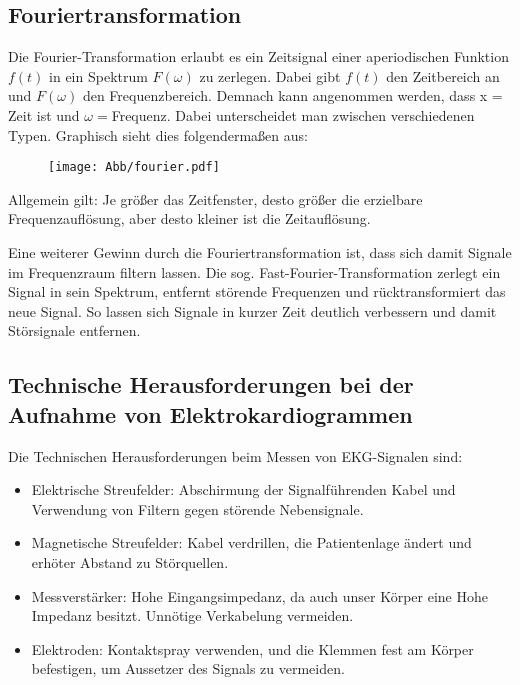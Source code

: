 \subsection{Fouriertransformation }
Die Fourier-Transformation erlaubt es ein Zeitsignal einer aperiodischen Funktion $f(t)$ in ein Spektrum $F(\omega)$ zu zerlegen. Dabei gibt $f(t)$ den Zeitbereich an und $F(\omega)$ den Frequenzbereich. Demnach kann angenommen werden, dass x = Zeit ist und $\omega= $Frequenz. 
Dabei unterscheidet man zwischen verschiedenen Typen. Graphisch sieht dies folgendermaßen aus:
\begin{figure}[H]
     \centering
     \texttt{[image: Abb/fourier.pdf]}
\end{figure}
Allgemein gilt: Je größer das Zeitfenster, desto größer die erzielbare Frequenzauflösung, aber desto kleiner ist die Zeitauflösung.

Eine weiterer Gewinn durch die Fouriertransformation ist, dass sich damit Signale im Frequenzraum filtern lassen. Die sog. Fast-Fourier-Transformation zerlegt ein Signal in sein Spektrum, entfernt störende Frequenzen und rücktransformiert das neue Signal. So lassen sich Signale in kurzer Zeit deutlich verbessern und damit Störsignale entfernen.

\subsection{Technische Herausforderungen bei der Aufnahme von Elektrokardiogrammen}
Die Technischen Herausforderungen beim Messen von EKG-Signalen sind:

\begin{itemize}
	\item Elektrische Streufelder:
  Abschirmung der Signalführenden Kabel und Verwendung von Filtern gegen störende Nebensignale.
	\item Magnetische Streufelder:
  Kabel verdrillen, die Patientenlage ändert und erhöter Abstand zu Störquellen.
	\item Messverstärker:
  Hohe Eingangsimpedanz, da auch unser Körper eine Hohe Impedanz besitzt. Unnötige Verkabelung vermeiden.
	\item Elektroden:
  Kontaktspray verwenden, und die Klemmen fest am Körper befestigen, um Aussetzer des Signals zu vermeiden.
\end{itemize}
